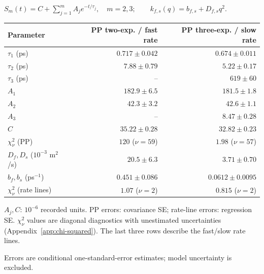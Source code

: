 \par\smallskip\begingroup\small
\setlength{\tabcolsep}{5pt}
\(S_m(t)=C+\sum_{j=1}^{m}A_j e^{-t/\tau_j},\quad m=2,3;\qquad k_{f,s}(q)=b_{f,s}+D_{f,s}q^2.\)
\par\smallskip\begin{tabular}{lrr}\toprule
Parameter & PP two-exp. / fast rate & PP three-exp. / slow rate\\\midrule
$\tau_1$ (ps) & $0.717\pm0.042$ & $0.674\pm0.011$\\
$\tau_2$ (ps) & $7.88\pm0.79$ & $5.22\pm0.17$\\
$\tau_3$ (ps) & -- & $619\pm60$\\
$A_1$ & $182.9\pm6.5$ & $181.5\pm1.8$\\
$A_2$ & $42.3\pm3.2$ & $42.6\pm1.1$\\
$A_3$ & -- & $8.47\pm0.28$\\
$C$ & $35.22\pm0.28$ & $32.82\pm0.23$\\
$\chi^2_\nu$ (PP) & $120$ ($\nu=59$) & $1.98$ ($\nu=57$)\\
$D_f,D_s$ ($10^{-3}$ m$^2$/s) & $20.5\pm6.3$ & $3.71\pm0.70$\\
$b_f,b_s$ (ps$^{-1}$) & $0.451\pm0.086$ & $0.0612\pm0.0095$\\
$\chi^2_\nu$ (rate lines) & $1.07$ ($\nu=2$) & $0.815$ ($\nu=2$)\\
\bottomrule\end{tabular}
\par\smallskip\noindent $A_j,C$: $10^{-6}$ recorded units. PP errors: covariance SE; rate-line errors: regression SE. $\chi^2_\nu$ values are diagonal diagnostics with unestimated uncertainties (Appendix~\ref{app:chi-squared}). The last three rows describe the fast/slow rate lines.
\par\smallskip\noindent Errors are conditional one-standard-error estimates; model uncertainty is excluded.
\par\endgroup
